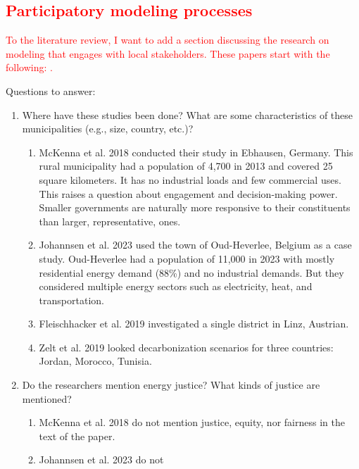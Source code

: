 \textcolor{red}{\subsection{Participatory modeling processes}}
\textcolor{red}{To the literature review, I want to add a section discussing the
research on modeling that engages with local stakeholders. These papers start
with the following:
\cite{mckenna_combining_2018,johannsen_municipal_2023,ben_amer_too_2020}.}

Questions to answer:

\begin{enumerate}
    \item Where have these studies been done? What are some characteristics of
    these municipalities (e.g., size, country, etc.)?
    \begin{enumerate}
        \item McKenna et al. 2018 \cite{mckenna_combining_2018} conducted their
        study in Ebhausen, Germany. This rural municipality had a population of
        4,700 in 2013 and covered 25 square kilometers. It has no industrial
        loads and few commercial uses. This raises a question about engagement
        and decision-making power. Smaller governments are naturally more
        responsive to their constituents than larger, representative, ones.
        \item Johannsen et al. 2023 \cite{johannsen_municipal_2023} used the
        town of Oud-Heverlee, Belgium as a case study. Oud-Heverlee had a
        population of 11,000 in 2023 with mostly residential energy demand
        (88\%) and no industrial demands. But they considered multiple energy
        sectors such as electricity, heat, and transportation.
        \item Fleischhacker et al. 2019 \cite{fleischhacker_portfolio_2019}
        investigated a single district in Linz, Austrian.
        \item Zelt et al. 2019 \cite{zelt_long-term_2019} looked decarbonization
        scenarios for three countries: Jordan, Morocco, Tunisia.
    \end{enumerate}
    \item Do the researchers mention energy justice? What kinds of justice are
    mentioned?
    \begin{enumerate}
        \item McKenna et al. 2018 \cite{mckenna_combining_2018} do not mention
        justice, equity, nor fairness in the text of the paper.
        \item Johannsen et al. 2023 \cite{johannsen_municipal_2023} do not

\end{enumerate}
\end{enumerate}
